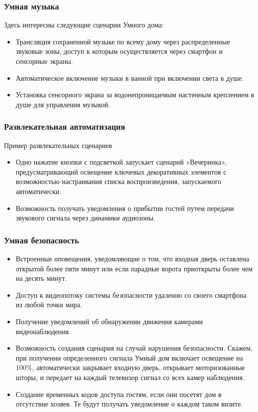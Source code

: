 \documentclass[a4paper,14pt]{extarticle}
\begin{document}
\subsubsection*{Умная музыка}
Здесь интересны следующие сценарии Умного дома:
\begin{itemize}
	\item Трансляция сохраненной музыке по всему дому через распределенные звуковые зоны, доступ к которым осуществляется через  смартфон и сенсорные экраны.
	\item Автоматическое включение музыки в ванной при включении света в душе.
	\item Установка сенсорного экрана за водонепроницаемым настенным креплением в душе для управления музыкой. 
\end{itemize}
\subsubsection*{Развлекательная автоматизация}
Пример развлекательных сценариев
\begin{itemize}
	\item  Одно нажатие кнопки с подсветкой запускает сценарий «Вечеринка», предусматривающий освещение ключевых декоративных элементов с возможностью настраивания списка воспроизведения, запускаемого автоматически.
	\item Возможность получать уведомления о прибытии гостей путем передачи звукового сигнала через динамики аудиозоны.
\end{itemize}
\subsubsection*{Умная безопасность}
\begin{itemize}
	\item Встроенные оповещения, уведомляющие о том, что входная дверь оставлена открытой более пяти минут или если парадные ворота приоткрыты более чем на десять минут.
	\item  Доступ к видеопотоку системы безопасности удаленно со своего смартфона из любой точки мира.
	\item Получение уведомлений об обнаружении движения камерами видеонаблюдения.
	\item Возможность создания сценария на случай нарушения безопасности. Скажем, при получении определенного сигнала Умный дом включает освещение на 100\%, автоматически закрывает входную дверь, открывает моторизованные шторы, и передает на каждый телевизор сигнал со всех камер наблюдения.
	\item Создание временных кодов доступа гостям, если они посетят дом в отсутствие хозяев. Те будут получать уведомление о каждом таком визите.
\end{itemize}
\end{document}
